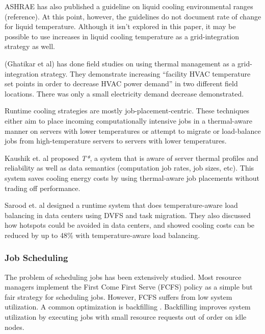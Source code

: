 ASHRAE has also published a guideline on liquid cooling environmental ranges (reference).  At this point, however, 
the guidelines do not document rate of change for liquid temperature.  Although it isn’t explored in this paper, 
it may be possible to use increases in liquid cooling temperature as a grid-integration strategy as well. 

(Ghatikar et al\cite{Ghatikar2012a}) has done field studies on using thermal management as a grid-integration 
strategy.  They demonstrate increasing “facility HVAC temperature set points in order to decrease HVAC power demand” 
in two different field locations.  There was only a small electricity demand decrease demonstrated.


Runtime cooling strategies are mostly job-placement-centric. These techniques either aim to place incoming computationally intensive jobs in a thermal-aware manner on servers with lower temperatures or attempt to migrate or load-balance jobs from high-temperature servers to servers with lower temperatures.

Kaushik et. al \cite{kaushik_t*:_2012} proposed \emph{T*}, a system that is aware of server thermal profiles and reliability as well as data semantics (computation job rates, job sizes, etc). This system saves cooling energy costs by using thermal-aware job placements without trading off performance.

Sarood et. al \cite{SaroodSC11} designed a runtime system that does temperature-aware load balancing in data centers using DVFS and task migration. They also discussed how hotspots could be avoided in data centers, and showed cooling costs can be reduced by up to 48\% with temperature-aware load balancing.

\subsubsection{Job Scheduling}
The problem of scheduling jobs has been extensively studied. Most resource managers implement the First Come First Serve (FCFS) policy
as a simple but fair strategy for scheduling jobs. However, FCFS suffers from low system utilization. A common optimization is backfilling
\cite{lifka_anl/ibm_1995,mualem_utilization_2001,feitelson_parallel_2004}. Backfilling improves system utilization by executing jobs with small resource requests out of order on idle nodes.

